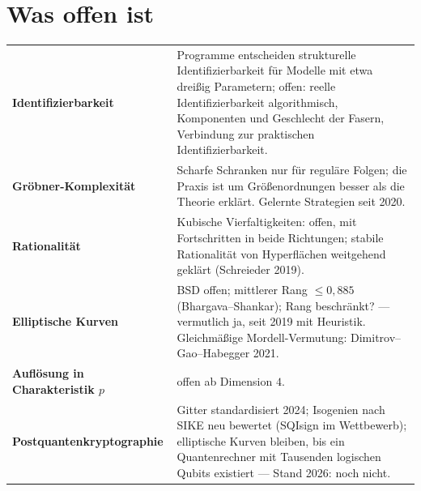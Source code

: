 \section{Was offen ist}

\begin{merksatz}
\begin{center}
{\small
\renewcommand{\arraystretch}{1.5}
\begin{tabular}{@{}P{3.0cm}P{5.6cm}@{}}
\toprule
\textbf{Identifizierbarkeit} & Programme entscheiden strukturelle Identifizierbarkeit für Modelle mit etwa dreißig Parametern; offen: reelle Identifizierbarkeit algorithmisch, Komponenten und Geschlecht der Fasern, Verbindung zur praktischen Identifizierbarkeit.\\
\textbf{Gröbner-Komplexität} & Scharfe Schranken nur für reguläre Folgen; die Praxis ist um Größenordnungen besser als die Theorie erklärt. Gelernte Strategien seit 2020.\\
\textbf{Rationalität} & Kubische Vierfaltigkeiten: offen, mit Fortschritten in beide Richtungen; stabile Rationalität von Hyperflächen weitgehend geklärt (Schreieder 2019).\\
\textbf{Elliptische Kurven} & BSD offen; mittlerer Rang $\le0{,}885$ (Bhargava--Shankar); Rang beschränkt? --- vermutlich ja, seit 2019 mit Heuristik. Gleichmäßige Mordell-Vermutung: Dimitrov--Gao--Habegger 2021.\\
\textbf{Auflösung in Charakteristik $p$} & offen ab Dimension $4$.\\
\textbf{Post\-quanten\-krypto\-graphie} & Gitter standardisiert 2024; Isogenien nach SIKE neu bewertet (SQIsign im Wettbewerb); elliptische Kurven bleiben, bis ein Quantenrechner mit Tausenden logischen Qubits existiert --- Stand 2026: noch nicht.\\
\bottomrule
\end{tabular}}
\end{center}

\begin{center}
\begin{minipage}{0.88\textwidth}
\end{minipage}
\end{center}
\end{merksatz}


